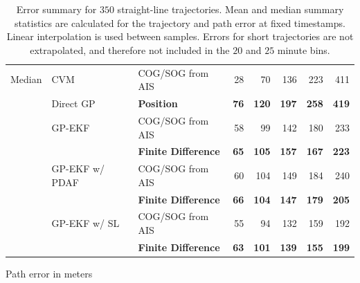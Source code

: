 \begin{table}
\begin{subtable}{\textwidth}
{\begin{tabular}{lllrrrrr}
                \midrule
                Median  & CVM            & COG/SOG from AIS      & 28      & 70      & 136     & 223     & 411     \\
                        & Direct GP      & \bf Position          & \bf 76  & \bf 120 & \bf 197 & \bf 258 & \bf 419 \\
                        & GP-EKF         & COG/SOG from AIS      & 58      & 99      & 142     & 180     & 233     \\
                        &                & \bf Finite Difference & \bf 65  & \bf 105 & \bf 157 & \bf 167 & \bf 223 \\
                        & GP-EKF w/ PDAF & COG/SOG from AIS      & 60      & 104     & 149     & 184     & 240     \\
                        &                & \bf Finite Difference & \bf 66  & \bf 104 & \bf 147 & \bf 179 & \bf 205 \\
                        & GP-EKF w/ SL   & COG/SOG from AIS      & 55      & 94      & 132     & 159     & 192     \\
                        &                & \bf Finite Difference & \bf 63  & \bf 101 & \bf 139 & \bf 155 & \bf 199 \\
                \bottomrule
            \end{tabular}


        }
        \caption{Path error in meters}
        \label{table:stats_straight_path_err}
    \end{subtable}
    \caption{Error summary for $350$ straight-line trajectories. Mean and median summary statistics are calculated for the trajectory and path error at fixed timestamps. Linear interpolation is used between samples. Errors for short trajectories are not extrapolated, and therefore not included in the $20$ and $25$ minute bins.}
    \label{table:stats_straight_line_error}
\end{table}

